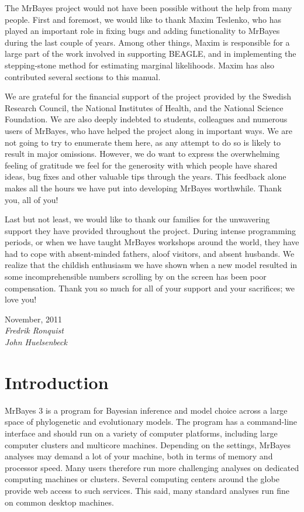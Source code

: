 \documentclass[12pt]{book}
\begin{document}
The MrBayes project would not have been possible without the help from many people. First and
foremost, we would like to thank Maxim Teslenko, who has played an important role in fixing bugs
and adding functionality to MrBayes during the last couple of years. Among other things, Maxim is
responsible for a large part of the work involved in supporting BEAGLE, and in implementing the
stepping-stone method for estimating marginal likelihoods. Maxim has also contributed several
sections to this manual.

We are grateful for the financial support of the project provided by the Swedish Research Council,
the National Institutes of Health, and the National Science Foundation. We are also deeply indebted
to students, colleagues and numerous users of MrBayes, who have helped the project along in
important ways. We are not going to try to enumerate them here, as any attempt to do so is likely
to result in major omissions. However, we do want to express the overwhelming feeling of gratitude
we feel for the generosity with which people have shared ideas, bug fixes and other valuable tips
through the years. This feedback alone makes all the hours we have put into developing MrBayes
worthwhile. Thank you, all of you!

Last but not least, we would like to thank our families for the unwavering support they have
provided throughout the project. During intense programming periods, or when we have taught MrBayes
workshops around the world, they have had to cope with absent-minded fathers, aloof visitors, and
absent husbands. We realize that the childish enthusiasm we have shown when a new model resulted in
some incomprehensible numbers scrolling by on the screen has been poor compensation. Thank you so
much for all of your support and your sacrifices; we love you!

\vspace{1cm}

November, 2011\hfill\\
\textit{Fredrik Ronquist}\hfill\\
\textit{John Huelsenbeck}\hfill\\

\mainmatter

\chapter{Introduction}
\label{intro}
MrBayes 3 is a program for Bayesian inference and model choice across a large space of phylogenetic
and evolutionary models. The program has a command-line interface and should run on a variety of
computer platforms, including large computer clusters and multicore machines. Depending on the
settings, MrBayes analyses may demand a lot of your machine, both in terms of memory and processor
speed. Many users therefore run more challenging analyses on dedicated computing machines or
clusters. Several computing centers around the globe provide web access to such services. This
said, many standard analyses run fine on common desktop machines.
\end{document}
